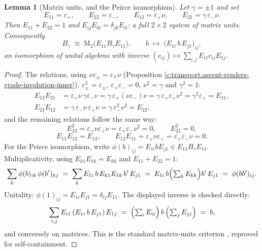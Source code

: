 \documentclass[11pt]{article}
\newtheorem{lemma}[theorem]{Lemma}
\theoremstyle{definition}
\theoremstyle{plain}
\providecommand{\Mat}{}\renewcommand{\Mat}{\mathrm{M}}
\begin{document}
\begin{lemma}[Matrix units, and the Peirce isomorphism]\label{c:transport.matrix-units-peirce-isomorphism}
Let $\gamma = \pm 1$ and set
\[
E_{11} = \varepsilon_+, \qquad E_{22} = \varepsilon_-, \qquad E_{12} = \varepsilon_+ \nu, \qquad E_{21} = \gamma\, \varepsilon_- \nu .
\]
Then $E_{11} + E_{22} = 1$ and $E_{ij} E_{kl} = \delta_{jk} E_{il}$: a full $2 \times 2$ system of matrix units. Consequently
\[
B_\gamma \;\cong\; \Mat_2\bigl(E_{11} B_\gamma E_{11}\bigr), \qquad b \;\longmapsto\; \bigl(E_{1i}\, b\, E_{j1}\bigr)_{ij},
\]
an isomorphism of unital algebras with inverse $(c_{ij}) \mapsto \sum_{i,j} E_{i1} c_{ij} E_{1j}$.
\end{lemma}
\begin{proof}
The relations, using $\nu \varepsilon_\pm = \varepsilon_\mp \nu$ (Proposition \ref{c:transport.ascent-renders-grade-involution-inner}), $\varepsilon_\pm^2 = \varepsilon_\pm$, $\varepsilon_+\varepsilon_- = 0$, $\nu^2 = \gamma$ and $\gamma^2 = 1$:
\begin{align*}
E_{12}E_{21} &= \varepsilon_+ \nu\, \gamma \varepsilon_- \nu = \gamma\, \varepsilon_+ (\nu \varepsilon_-) \nu = \gamma\, \varepsilon_+ \varepsilon_+ \nu^2 = \gamma^2 \varepsilon_+ = E_{11},\\
E_{21}E_{12} &= \gamma\, \varepsilon_- \nu\, \varepsilon_+ \nu = \gamma\, \varepsilon_-^2 \nu^2 = E_{22},
\end{align*}
and the remaining relations follow the same way:
\[
E_{12}^2 = \varepsilon_+ \nu \varepsilon_+ \nu = \varepsilon_+ \varepsilon_- \nu^2 = 0, \qquad E_{21}^2 = 0,
\]
\[
E_{11}E_{12} = E_{12}, \qquad
E_{12}E_{11} = \varepsilon_+ \nu \varepsilon_+ = \varepsilon_+\varepsilon_-\nu = 0 .
\] For the Peirce isomorphism, write $\phi(b)_{ij} = E_{1i} b E_{j1} \in E_{11} B_\gamma E_{11}$. Multiplicativity, using $E_{k1}E_{1k} = E_{kk}$ and $E_{11} + E_{22} = 1$:
\[
\sum_k \phi(b)_{ik}\,\phi(b')_{kj}
\;=\; \sum_k E_{1i}\, b\, E_{k1}E_{1k}\, b'\, E_{j1}
\;=\; E_{1i}\, b \Bigl(\textstyle\sum_k E_{kk}\Bigr) b'\, E_{j1}
\;=\; \phi(bb')_{ij} .
\]
Unitality: $\phi(1)_{ij} = E_{1i}E_{j1} = \delta_{ij} E_{11}$. The displayed inverse is checked directly:
\[
\sum_{i,j} E_{i1}\, (E_{1i}\, b\, E_{j1})\, E_{1j} \;=\; \Bigl(\textstyle\sum_i E_{ii}\Bigr)\, b\, \Bigl(\textstyle\sum_j E_{jj}\Bigr) \;=\; b ,
\]
and conversely on matrices. This is the standard matrix-units criterion \cite{LamFC2001}, reproved for self-containment.

\end{proof}
\end{document}
